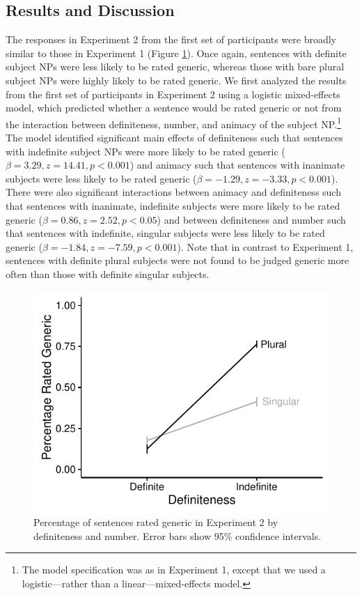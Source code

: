 \documentclass[10pt,letterpaper]{article}
\begin{document}
\subsection{Results and Discussion}

The responses in Experiment 2 from the first set of participants were broadly similar to those in Experiment 1 (Figure \ref{fig:e2}). Once again, sentences with definite subject NPs were less likely to be rated generic, whereas those with bare plural subject NPs were highly likely to be rated generic. We first analyzed the results from the first set of participants in Experiment 2 using a logistic mixed-effects model, which predicted whether a sentence would be rated generic or not from the interaction between definiteness, number, and animacy of the subject NP.\footnote{The model specification was as in Experiment 1, except that we used a logistic---rather than a linear---mixed-effects model.} The model identified significant main effects of definiteness such that sentences with indefinite subject NPs were more likely to be rated generic (\(\beta = 3.29, z = 14.41, p < 0.001\)) and animacy such that sentences with inanimate subjects were less likely to be rated generic (\(\beta = -1.29, z = -3.33, p < 0.001\)). There were also significant interactions between animacy and definiteness such that sentences with inanimate, indefinite subjects were more likely to be rated generic (\(\beta = 0.86, z = 2.52, p < 0.05\)) and between definiteness and number such that sentences with indefinite, singular subjects were less likely to be rated generic (\(\beta = -1.84, z = -7.59, p < 0.001\)). Note that in contrast to Experiment 1, sentences with definite plural subjects were not found to be judged generic more often than those with definite singular subjects.

\begin{figure}[t]
\centering
\includegraphics[width=.8\linewidth]{figures/e2-2016.pdf}
\caption{\label{fig:e2} Percentage of sentences rated generic in Experiment 2 by definiteness and number. Error bars show 95\% confidence intervals.}
\end{figure}
\end{document}
